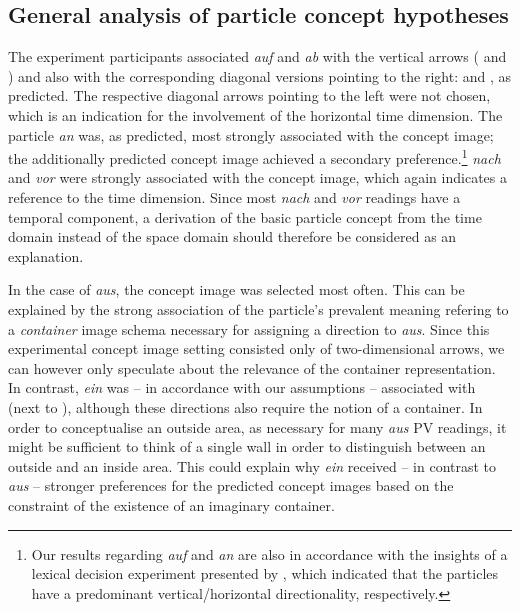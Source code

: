 \documentclass[output=paper]{langsci/langscibook}
\begin{document}
\subsection{General analysis of particle concept hypotheses}
\label{sec:disc-general}

The experiment participants associated \textit{auf} and \textit{ab}
with the vertical arrows ( and ) and
also with the corresponding diagonal versions pointing to the right:
 and , as predicted. The
respective diagonal arrows pointing to the left were not chosen, which
is an indication for the involvement of the horizontal time dimension.
%
The particle \textit{an} was, as predicted, most strongly associated
with the  concept image; the additionally predicted
 concept image achieved a secondary preference.\footnote{Our
  results regarding \textit{auf} and \textit{an} are also in
  accordance with the insights of a lexical decision experiment
  presented by \cite{FrassinelliEtAl:17}, which indicated that the
  particles have a predominant vertical/horizontal directionality,
  respectively.}
%
\textit{nach} and \textit{vor} were strongly associated with the
 concept image, which again indicates a reference to the time
dimension. Since most \textit{nach} and \textit{vor} readings have a
temporal component, a derivation of the basic particle concept from
the time domain instead of the space domain should therefore be
considered as an explanation.

In the case of \textit{aus}, the  concept image was selected
most often. This can be explained by the strong association of the
particle's prevalent meaning refering to a \textit{container} image
schema necessary for assigning a direction to \textit{aus}. Since this
experimental concept image setting consisted only of two-dimensional arrows, we
can however only speculate about the relevance of the container
representation. In contrast, \textit{ein} was -- in accordance with our
assumptions -- associated with  (next to
), although these directions also require the notion
of a container. In order to conceptualise an outside area, as
necessary for many \textit{aus} PV readings, it might be sufficient to
think of a single wall in order to distinguish between an outside and
an inside area. This could explain why \textit{ein} received -- in
contrast to \textit{aus} -- stronger preferences for the predicted concept images
based on the constraint of the existence of an imaginary container.
\end{document}
